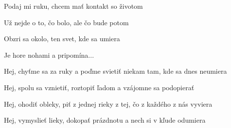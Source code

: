 \begin{song}
\bigskip

    \par
{}    \par

\bigskip

 Podaj mi ruku, chcem mať kontakt so životom \par
{} Už nejde o to, čo bolo, ale čo bude potom \par
{} Obzri sa okolo, ten svet, kde sa umiera \par
{} Je hore nohami a pripomína... \par

\bigskip

 Hej, chyťme sa za ruky a poďme svietiť niekam tam, kde sa dnes neumiera \par
{} Hej,  spolu sa vznietiť,  roztopiť ľadom a vzájomne sa podopierať \par
{} Hej, ohodiť obleky, piť z jednej rieky z tej, čo z každého z nás vyviera \par
{} Hej,  vymyslieť lieky,  dokopať prázdnotu a nech si v kľude odumiera \par

\bigskip

     \par

\end{song}
